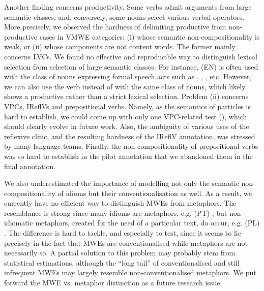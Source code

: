 \documentclass[output=paper,modfonts]{langscibook}
\begin{document}
Another finding concerns productivity. Some verbs admit arguments from large semantic classes, and, conversely, some nouns select various verbal operators. More precisely, we observed 
the hardness of delimiting productive from non-productive cases in VMWE categories: (i) whose semantic non-com\-po\-si\-tio\-na\-li\-ty is weak, or (ii) whose components are not content words. The former mainly concerns LVCs. We found no effective and reproducible way to distinguish lexical selection from selection of large semantic classes. For instance, (EN)  is often used with the class of nouns expressing formal speech acts such as , , , etc. However, we can also use the verb  instead of  with the same class of nouns, which likely shows a productive rather than a strict lexical selection. Problem (ii) concerns VPCs, IReflVs and prepositional verbs. Namely, as the semantics of particles is hard to establish, we could come up with only one VPC-related test (), which should clearly evolve in future work. Also, the ambiguity of various uses of the reflexive clitic, and the resulting hardness of the IReflV annotation, was stressed by many language teams. Finally, the non-compositionality of prepositional verbs was so hard to establish in the pilot annotation that we abandoned them in the final annotation.

\largerpage
We also underestimated the importance of modelling not only the semantic non-compositionality of idioms but their conventionalisation as well. As a result, we currently have no efficient way to distinguish MWEs from metaphors. The resemblance is strong since many idioms are metaphors, e.g. (PT) , but non-idiomatic metaphors, created for the need of a particular text, do occur, e.g. (PL) . The difference is hard to tackle, and especially to test, since it seems to lie precisely in the fact that MWEs are conventionalised while metaphors are not necessarily so. A partial solution to this problem may probably stem from statistical estimations, although the ``long tail'' of conventionalised and still infrequent MWEs may largely resemble non-conventionalised metaphors. We put forward the MWE vs. metaphor distinction as a future research issue.

\end{document}

